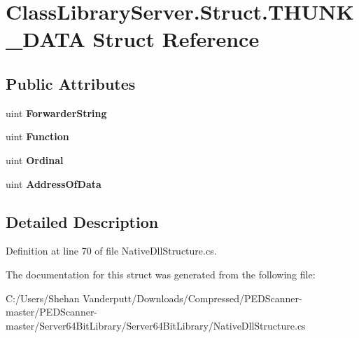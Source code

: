 \hypertarget{struct_class_library_server_1_1_struct_1_1_t_h_u_n_k___d_a_t_a}{}\section{Class\+Library\+Server.\+Struct.\+T\+H\+U\+N\+K\+\_\+\+D\+A\+TA Struct Reference}
\label{struct_class_library_server_1_1_struct_1_1_t_h_u_n_k___d_a_t_a}
\subsection*{Public Attributes}
\begin{DoxyCompactItemize}
\item 
\mbox{\label{struct_class_library_server_1_1_struct_1_1_t_h_u_n_k___d_a_t_a_ad3250355abd709e2cec85824004c32bd}} 
uint {\bfseries Forwarder\+String}
\item 
\mbox{\label{struct_class_library_server_1_1_struct_1_1_t_h_u_n_k___d_a_t_a_a4df01850945607d80f8924690e170a19}} 
uint {\bfseries Function}
\item 
\mbox{\label{struct_class_library_server_1_1_struct_1_1_t_h_u_n_k___d_a_t_a_abb64a8e37b2c6731c5413bd49a4ac595}} 
uint {\bfseries Ordinal}
\item 
\mbox{\label{struct_class_library_server_1_1_struct_1_1_t_h_u_n_k___d_a_t_a_aba593431b4830604ea4f7dbf2b4b7c19}} 
uint {\bfseries Address\+Of\+Data}
\end{DoxyCompactItemize}


\subsection{Detailed Description}


Definition at line 70 of file Native\+Dll\+Structure.\+cs.



The documentation for this struct was generated from the following file\+:\begin{DoxyCompactItemize}
\item 
C\+:/\+Users/\+Shehan Vanderputt/\+Downloads/\+Compressed/\+P\+E\+D\+Scanner-\/master/\+P\+E\+D\+Scanner-\/master/\+Server64\+Bit\+Library/\+Server64\+Bit\+Library/Native\+Dll\+Structure.\+cs\end{DoxyCompactItemize}
